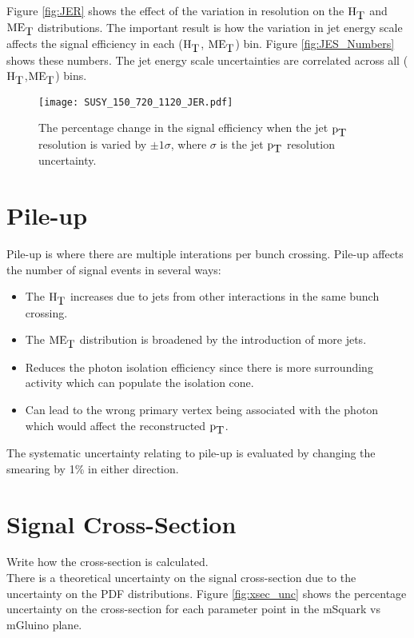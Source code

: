 Figure \ref{fig:JER} shows the effect of the variation in resolution on the
$\mbox{H}_{\mbox{T}}$ and $\mbox{ME}_{\mbox{T}}$ distributions. The important result is how the variation in jet
energy scale affects the signal efficiency in each ($\mbox{H}_{\mbox{T}}$, $\mbox{ME}_{\mbox{T}}$) bin. Figure 
\ref{fig:JES_Numbers} shows these numbers. The jet energy scale uncertainties 
are correlated across all ($\mbox{H}_{\mbox{T}}$,$\mbox{ME}_{\mbox{T}}$) bins.

\begin{figure}
\begin{center}
\texttt{[image: SUSY\_150\_720\_1120\_JER.pdf]}
\end{center}
\caption{The percentage change in the signal efficiency when the jet $\mbox{p}_{\mbox{T}}$
resolution is varied by $\pm1\sigma$, where $\sigma$ is the jet $\mbox{p}_{\mbox{T}}$ resolution 
uncertainty.}
\label{fig:JER_Numbers}
\end{figure}

\section{Pile-up}

Pile-up is where there are multiple interations per bunch crossing. Pile-up
affects the number of signal events in several ways:

\begin{itemize}
\item The $\mbox{H}_{\mbox{T}}$ increases due to jets from other interactions in the same bunch
crossing.
\item The $\mbox{ME}_{\mbox{T}}$ distribution is broadened by the introduction of more jets.
\item Reduces the photon isolation efficiency since there is more surrounding
activity which can populate the isolation cone.
\item Can lead to the wrong primary vertex being associated with the photon
which would affect the reconstructed $\mbox{p}_{\mbox{T}}$.
\end{itemize}

The systematic uncertainty relating to pile-up is evaluated by changing the
smearing by 1\% in either direction.

\section{Signal Cross-Section}

Write how the cross-section is calculated. \\

There is a theoretical uncertainty on the signal cross-section due to the
uncertainty on the PDF distributions. Figure \ref{fig:xsec_unc} shows the
percentage uncertainty on the cross-section for each parameter point in the
mSquark vs mGluino plane.

